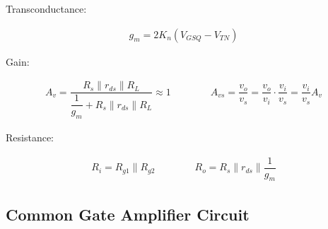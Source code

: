 Transconductance:

\begin{equation*}
  \begin{aligned}
    g_m = 2 K_n \left( V_{GSQ} - V_{TN} \right)
  \end{aligned}
\end{equation*}

Gain:

\begin{equation*}
  \begin{aligned}
    A_v = \dfrac{R_s \parallel r_{ds} \parallel R_L}{\dfrac{1}{g_m} + R_s \parallel r_{ds} \parallel R_L} \approx 1 \quad\quad \quad\quad 
    A_{vs} = \dfrac{v_o}{v_s} = \dfrac{v_o}{v_i} \cdot \dfrac{v_i}{v_s} = \dfrac{v_i}{v_s} A_v
  \end{aligned}
\end{equation*}

Resistance:

\begin{equation*}
  \begin{aligned}
    R_i = R_{g1} \parallel R_{g2} \quad\quad \quad\quad 
    R_o = R_s \parallel r_{ds} \parallel \dfrac{1}{g_m} 
  \end{aligned}
\end{equation*}

\subsection{Common Gate Amplifier Circuit}

